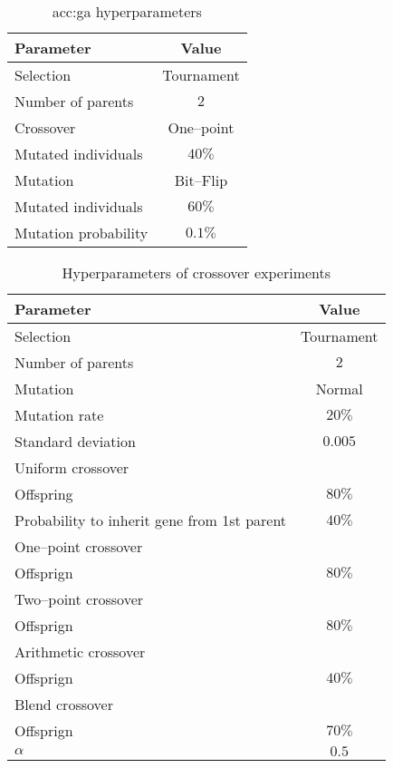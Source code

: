 \begin{table}[h]
    \centering
    \begin{tabular}{|l|c|}
        \hline
        \textbf{Parameter} & \textbf{Value} \\
        \hline
        Selection & Tournament \\
        \quad Number of parents & $2$ \\
        Crossover & One--point \\
        \quad Mutated individuals & $40\%$ \\
        Mutation & Bit--Flip \\
        \quad Mutated individuals & $60\%$ \\
        \quad Mutation probability & $0.1\%$ \\
        \hline
    \end{tabular}
    \caption{\acrlong*{acc:ga} hyperparameters}
    \label{tab:gahyperparameters}
\end{table}

\begin{table}[h]
    \centering
    \begin{tabular}{|l|c|}
        \hline
        \textbf{Parameter} & \textbf{Value} \\
        \hline
        Selection & Tournament \\
        \quad Number of parents & $2$ \\
        Mutation & Normal \\
        \quad Mutation rate & $20\%$ \\
        \quad Standard deviation & $0.005$ \\
        \hline
        Uniform crossover & \\
        \quad Offspring & $80\%$ \\
        \quad Probability to inherit gene from 1st parent & $40\%$ \\
        One--point crossover & \\
        \quad Offsprign & $80\%$ \\
        Two--point crossover & \\
        \quad Offsprign & $80\%$ \\
        Arithmetic crossover & \\
        \quad Offsprign & $40\%$ \\
        Blend crossover & \\
        \quad Offsprign & $70\%$ \\
        \quad $\alpha$ & $0.5$ \\
        \hline
    \end{tabular}
    \caption{Hyperparameters of crossover experiments}
    \label{tab:escrossoverhyperparmarameters}
\end{table}

